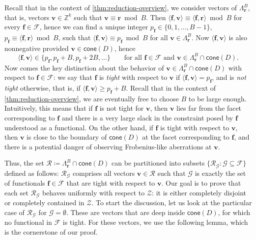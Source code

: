 \documentclass{article}
\renewcommand{\geq}{\geqslant}
\newcommand{\Z}{\mathbb{Z}}
\newcommand{\tup}[1]{{\mathbf{#1}}}
\newcommand{\ff}{\tup f}
\newcommand{\rr}{\tup r}
\newcommand{\myvv}{\tup v} %
\newcommand{\Ff}{\mathcal{F}}
\newcommand{\Gg}{\mathcal{G}}
\newcommand{\Rr}{\mathcal{R}}
\newcommand{\Zz}{\mathcal{Z}}
\newcommand{\sca}[2]{\langle #1,#2\rangle}
\newcommand{\realcone}{\mathsf{cone}}
\begin{document}
Recall that in the context of \cref{thm:reduction-overview}, we consider vectors of $\Lambda_\rr^B$, that is, vectors $\myvv\in \Z^k$ such that $\myvv\equiv \rr\bmod B$. Then $\sca{\ff}{\myvv}\equiv \sca{\ff}{\rr}\bmod B$ for every $\ff\in \Ff$, hence we can find a unique integer $p_\ff\in \{0,1,\ldots,B-1\}$, $p_\ff\equiv \sca{\ff}{\rr}\bmod B$, such that $\sca{\ff}{\myvv}\equiv p_\ff\bmod B$ for all $\myvv\in \Lambda_\rr^B$. Now $\sca{\ff}{\myvv}$ is also nonnegative provided $\myvv\in \realcone(D)$, hence
$$ \sca{\ff}{\myvv}\in \{p_\ff,p_\ff+B,p_\ff+2B,\ldots\}\qquad\textrm{for all }\ff\in \Ff\textrm{ and } \myvv\in\Lambda_\rr^B\cap \realcone(D).$$
Now comes the key distinction about the behavior of $\myvv\in \Lambda_{\rr}^B\cap \realcone(D)$ with respect to $\ff\in \Ff$: we say that $\ff$ is {\em{tight}} with respect to $\myvv$ if $\sca{\ff}{\myvv}=p_\ff$, and is {\em{not tight}} otherwise, that is, if $\sca{\ff}{\myvv}\geq p_\ff+B$. Recall that in the context of \cref{thm:reduction-overview}, we are eventually free to choose $B$ to be large enough. Intuitively, this means that if $\ff$ is not tight for $\myvv$, then $\myvv$ lies far from the facet corresponding to $\ff$ and there is a very large slack in the constraint posed by $\ff$ understood as a functional. On the other hand, if $\ff$ is tight with respect to $\myvv$, then $\myvv$ is close to the boundary of $\realcone(D)$ at the facet corresponding to $\ff$, and there is a potential danger of observing Frobenius-like aberrations at $\myvv$.

Thus, the set $\Rr\coloneqq \Lambda_\rr^B\cap \realcone(D)$ can be partitioned into subsets $\{\Rr_\Gg\colon \Gg\subseteq \Ff\}$ defined as follows: $\Rr_{\Gg}$ comprises all vectors $\myvv\in \Rr$ such that $\Gg$ is exactly the set of functionals $\ff\in \Ff$ that are tight with respect to $\myvv$. Our goal is to prove that each set $\Rr_\Gg$ behaves uniformly with respect to $\Zz$: it is either completely disjoint or completely contained in $\Zz$. To start the discussion, let us look at the particular case of $\Rr_\Gg$ for $\Gg=\emptyset$. These are vectors that are deep inside $\realcone(D)$, for which no functional in $\Ff$ is tight. For these vectors, we use the following lemma, which is the cornerstone of our proof.
\end{document}
